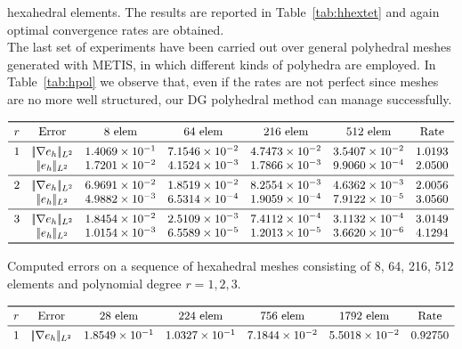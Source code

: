\documentclass[12pt, a4paper]{article}
\theoremstyle{definition}
\theoremstyle{plain}
\theoremstyle{plain}
\theoremstyle{definition}
\begin{document}
hexahedral elements. The results are reported in Table~\ref{tab:hhextet} and 
again optimal convergence rates are obtained.\\
The last set of experiments have been carried out over general polyhedral 
meshes generated with METIS, in which different kinds of polyhedra are 
employed. In Table~\ref{tab:hpol} we observe that, even if the rates are not 
perfect since meshes are no more well structured, our DG polyhedral method can 
manage successfully.
\begin{table}[h!]\footnotesize
	\centering
	\[
	\begin{array}{ccccccc}
	\toprule
	r & \text{Error} & \text{8 elem} & \text{64 elem} & \text{216 elem} & \text{512 elem} & \text{Rate} \\ 
	\midrule
	1 & |\!|\nabla e_{h}|\!|_{L^2} & 1.4069 \times 10^{-1} & 7.1546 \times 10^{-2} & 4.7473 \times 10^{-2} & 3.5407 \times 10^{-2} & 1.0193\\
	& |\!|e_{h}|\!|_{L^2} & 1.7201 \times 10^{-2} & 4.1524 \times 10^{-3} & 1.7866 \times 10^{-3} & 9.9060 \times 10^{-4} & 2.0500\\
	\midrule
	2 & |\!|\nabla e_{h}|\!|_{L^2} & 6.9691 \times 10^{-2} & 1.8519 \times 10^{-2} & 8.2554 \times 10^{-3} & 4.6362 \times 10^{-3} & 2.0056\\
	& |\!|e_{h}|\!|_{L^2} & 4.9882 \times 10^{-3} & 6.5314 \times 10^{-4} & 1.9059 \times 10^{-4} & 7.9122 \times 10^{-5} & 3.0560\\
	\midrule
	3 & |\!|\nabla e_{h}|\!|_{L^2} & 1.8454 \times 10^{-2} & 2.5109 \times 10^{-3} & 7.4112 \times 10^{-4} & 3.1132 \times 10^{-4} & 3.0149\\
	& |\!|e_{h}|\!|_{L^2} & 1.0154 \times 10^{-3} & 6.5589 \times 10^{-5} & 1.2013 \times 10^{-5} & 3.6620 \times 10^{-6} & 4.1294\\
	\bottomrule
	\end{array}
	\]
	\caption{Computed errors on a sequence of hexahedral meshes consisting of 
		8, 64, 216, 512 elements and polynomial degree $r=1,2,3$.} \label{tab:hhex}
	\[
	\begin{array}{ccccccc}
	\toprule
	r & \text{Error} & \text{28 elem} & \text{224 elem} & \text{756 elem} & \text{1792 elem} & \text{Rate} \\ 
	\midrule
	1 & |\!|\nabla e_{h}|\!|_{L^2} & 1.8549 \times 10^{-1} & 1.0327 \times 10^{-1} & 7.1844 \times 10^{-2} & 5.5018 \times 10^{-2} & 0.92750\\

\end{array}\]
\end{table}
\end{document}
